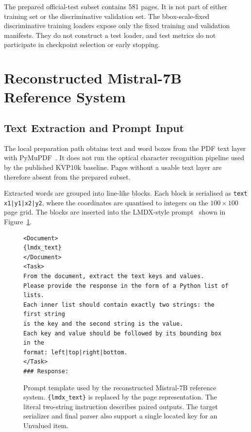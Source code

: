 The prepared official-test subset contains 581 pages. It is not part of either
training set or the discriminative validation set. The bbox-scale-fixed
discriminative training loaders expose only the fixed training and validation
manifests. They do not construct a test loader, and test metrics do not
participate in checkpoint selection or early stopping.

\section{Reconstructed Mistral-7B Reference System}
\label{sec:mistral-implementation}

\subsection{Text Extraction and Prompt Input}
\label{sec:text-processing}

The local preparation path obtains text and word boxes from the PDF text layer
with PyMuPDF~\cite{pymupdf}. It does not run the optical character recognition
pipeline used by the published KVP10k baseline. Pages without a usable text
layer are therefore absent from the prepared subset.

Extracted words are grouped into line-like blocks. Each block is serialised as
\texttt{text x1|y1|x2|y2}, where the coordinates are quantised to integers on
the $100\times100$ page grid. The blocks are inserted into the LMDX-style
prompt~\cite{lmdx} shown in Figure~\ref{fig:stage3-prompt}.

\begin{figure}[ht]
\centering
\begin{minipage}{0.9\textwidth}
\small
\begin{verbatim}
<Document>
{lmdx_text}
</Document>
<Task>
From the document, extract the text keys and values.
Please provide the response in the form of a Python list of lists.
Each inner list should contain exactly two strings: the first string
is the key and the second string is the value.
Each key and value should be followed by its bounding box in the
format: left|top|right|bottom.
</Task>
### Response:
\end{verbatim}
\end{minipage}
\caption{Prompt template used by the reconstructed Mistral-7B reference
system. \texttt{\{lmdx\_text\}} is replaced by the page representation. The
literal two-string instruction describes paired outputs. The target serializer
and final parser also support a single located key for an Unvalued item.}
\label{fig:stage3-prompt}
\end{figure}

